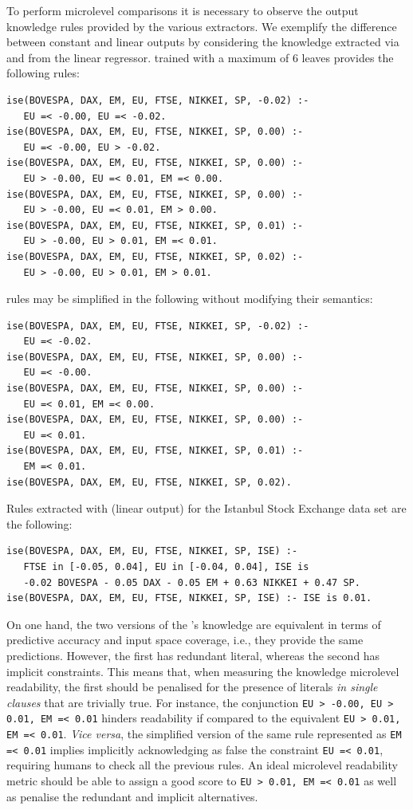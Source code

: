 \documentclass[sigconf]{acmart}
\begin{document}
To perform microlevel comparisons it is necessary to observe the output knowledge rules provided by the various extractors.
%
We exemplify the difference between constant and linear outputs by considering the knowledge extracted via \cart{} and \creepy{} from the linear regressor.
%
\cart{} trained with a maximum of 6 leaves provides the following rules:
%
\begin{lstlisting}
ise(BOVESPA, DAX, EM, EU, FTSE, NIKKEI, SP, -0.02) :-
   EU =< -0.00, EU =< -0.02.
ise(BOVESPA, DAX, EM, EU, FTSE, NIKKEI, SP, 0.00) :-
   EU =< -0.00, EU > -0.02.
ise(BOVESPA, DAX, EM, EU, FTSE, NIKKEI, SP, 0.00) :-
   EU > -0.00, EU =< 0.01, EM =< 0.00.
ise(BOVESPA, DAX, EM, EU, FTSE, NIKKEI, SP, 0.00) :-
   EU > -0.00, EU =< 0.01, EM > 0.00.
ise(BOVESPA, DAX, EM, EU, FTSE, NIKKEI, SP, 0.01) :-
   EU > -0.00, EU > 0.01, EM =< 0.01.
ise(BOVESPA, DAX, EM, EU, FTSE, NIKKEI, SP, 0.02) :-
   EU > -0.00, EU > 0.01, EM > 0.01.
\end{lstlisting}
%
\cart{} rules may be simplified in the following without modifying their semantics:
%
\begin{lstlisting}
ise(BOVESPA, DAX, EM, EU, FTSE, NIKKEI, SP, -0.02) :-
   EU =< -0.02.
ise(BOVESPA, DAX, EM, EU, FTSE, NIKKEI, SP, 0.00) :-
   EU =< -0.00.
ise(BOVESPA, DAX, EM, EU, FTSE, NIKKEI, SP, 0.00) :-
   EU =< 0.01, EM =< 0.00.
ise(BOVESPA, DAX, EM, EU, FTSE, NIKKEI, SP, 0.00) :-
   EU =< 0.01.
ise(BOVESPA, DAX, EM, EU, FTSE, NIKKEI, SP, 0.01) :-
   EM =< 0.01.
ise(BOVESPA, DAX, EM, EU, FTSE, NIKKEI, SP, 0.02).
\end{lstlisting}
%
Rules extracted with \creepy{} (linear output) for the Istanbul Stock Exchange data set are the following:
%
\begin{lstlisting}
ise(BOVESPA, DAX, EM, EU, FTSE, NIKKEI, SP, ISE) :-
   FTSE in [-0.05, 0.04], EU in [-0.04, 0.04], ISE is 
   -0.02 BOVESPA - 0.05 DAX - 0.05 EM + 0.63 NIKKEI + 0.47 SP.
ise(BOVESPA, DAX, EM, EU, FTSE, NIKKEI, SP, ISE) :- ISE is 0.01.
\end{lstlisting}

On one hand, the two versions of the \cart{}'s knowledge are equivalent in terms of predictive accuracy and input space coverage, i.e., they provide the same predictions.
%
However, the first has redundant literal, whereas the second has implicit constraints.
%
This means that, when measuring the knowledge microlevel readability, the first should be penalised for the presence of literals \emph{in single clauses} that are trivially true.
%
For instance, the conjunction \verb|EU > -0.00, EU > 0.01, EM =< 0.01| hinders readability if compared to the equivalent \verb|EU > 0.01, EM =< 0.01|.
%
\emph{Vice versa}, the simplified version of the same rule represented as \verb|EM =< 0.01| implies implicitly acknowledging as false the constraint \verb|EU =< 0.01|, requiring humans to check all the previous rules.
%
An ideal microlevel readability metric should be able to assign a good score to \verb|EU > 0.01, EM =< 0.01| as well as penalise the redundant and implicit alternatives.
\end{document}
